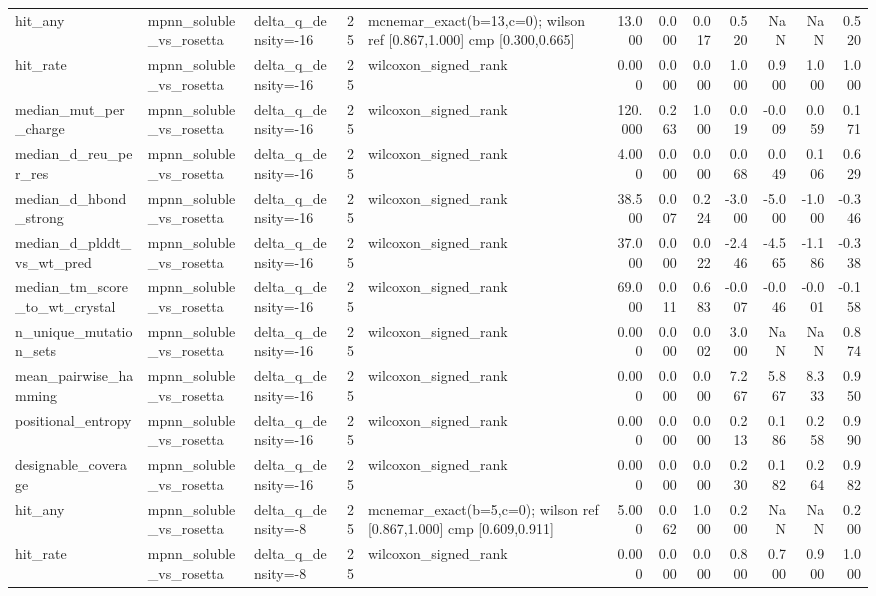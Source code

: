 \begin{table}
{\begin{tabular}{lllrlrrrrrrr}
hit\_any & mpnn\_soluble\_vs\_rosetta & delta\_q\_density=-16 & 25 & mcnemar\_exact(b=13,c=0); wilson ref [0.867,1.000] cmp [0.300,0.665] & 13.000 & 0.000 & 0.017 & 0.520 & NaN & NaN & 0.520 \\
hit\_rate & mpnn\_soluble\_vs\_rosetta & delta\_q\_density=-16 & 25 & wilcoxon\_signed\_rank & 0.000 & 0.000 & 0.000 & 1.000 & 0.900 & 1.000 & 1.000 \\
median\_mut\_per\_charge & mpnn\_soluble\_vs\_rosetta & delta\_q\_density=-16 & 25 & wilcoxon\_signed\_rank & 120.000 & 0.263 & 1.000 & 0.019 & -0.009 & 0.059 & 0.171 \\
median\_d\_reu\_per\_res & mpnn\_soluble\_vs\_rosetta & delta\_q\_density=-16 & 25 & wilcoxon\_signed\_rank & 4.000 & 0.000 & 0.000 & 0.068 & 0.049 & 0.106 & 0.629 \\
median\_d\_hbond\_strong & mpnn\_soluble\_vs\_rosetta & delta\_q\_density=-16 & 25 & wilcoxon\_signed\_rank & 38.500 & 0.007 & 0.224 & -3.000 & -5.000 & -1.000 & -0.346 \\
median\_d\_plddt\_vs\_wt\_pred & mpnn\_soluble\_vs\_rosetta & delta\_q\_density=-16 & 25 & wilcoxon\_signed\_rank & 37.000 & 0.000 & 0.022 & -2.446 & -4.565 & -1.186 & -0.338 \\
median\_tm\_score\_to\_wt\_crystal & mpnn\_soluble\_vs\_rosetta & delta\_q\_density=-16 & 25 & wilcoxon\_signed\_rank & 69.000 & 0.011 & 0.683 & -0.007 & -0.046 & -0.001 & -0.158 \\
n\_unique\_mutation\_sets & mpnn\_soluble\_vs\_rosetta & delta\_q\_density=-16 & 25 & wilcoxon\_signed\_rank & 0.000 & 0.000 & 0.002 & 3.000 & NaN & NaN & 0.874 \\
mean\_pairwise\_hamming & mpnn\_soluble\_vs\_rosetta & delta\_q\_density=-16 & 25 & wilcoxon\_signed\_rank & 0.000 & 0.000 & 0.000 & 7.267 & 5.867 & 8.333 & 0.950 \\
positional\_entropy & mpnn\_soluble\_vs\_rosetta & delta\_q\_density=-16 & 25 & wilcoxon\_signed\_rank & 0.000 & 0.000 & 0.000 & 0.213 & 0.186 & 0.258 & 0.990 \\
designable\_coverage & mpnn\_soluble\_vs\_rosetta & delta\_q\_density=-16 & 25 & wilcoxon\_signed\_rank & 0.000 & 0.000 & 0.000 & 0.230 & 0.182 & 0.264 & 0.982 \\
hit\_any & mpnn\_soluble\_vs\_rosetta & delta\_q\_density=-8 & 25 & mcnemar\_exact(b=5,c=0); wilson ref [0.867,1.000] cmp [0.609,0.911] & 5.000 & 0.062 & 1.000 & 0.200 & NaN & NaN & 0.200 \\
hit\_rate & mpnn\_soluble\_vs\_rosetta & delta\_q\_density=-8 & 25 & wilcoxon\_signed\_rank & 0.000 & 0.000 & 0.000 & 0.800 & 0.700 & 0.900 & 1.000 \\

\end{tabular}}
\end{table}
